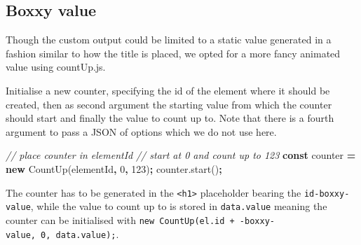 \documentclass[
]{krantz}
\makeatletter
\newenvironment{Shaded}{\begin{snugshade}}{\end{snugshade}}
\newcommand{\AttributeTok}[1]{\textcolor[rgb]{0.61,0.61,0.61}{#1}}
\newcommand{\CommentTok}[1]{\textcolor[rgb]{0.37,0.37,0.37}{\textit{#1}}}
\newcommand{\DecValTok}[1]{\textcolor[rgb]{0.06,0.06,0.06}{#1}}
\newcommand{\KeywordTok}[1]{\textcolor[rgb]{0.27,0.27,0.27}{\textbf{#1}}}
\newcommand{\NormalTok}[1]{#1}
\newcommand{\OperatorTok}[1]{\textcolor[rgb]{0.43,0.43,0.43}{\textbf{#1}}}
\newcommand{\StringTok}[1]{\textcolor[rgb]{0.5,0.5,0.5}{#1}}
\newcommand{\VariableTok}[1]{\textcolor[rgb]{0,0,0}{#1}}
\newenvironment{kframe}{%
\medskip{}
\setlength{\fboxsep}{.8em}
 \def\at@end@of@kframe{}%
 \ifinner\ifhmode%
  \def\at@end@of@kframe{\end{minipage}}%
  \begin{minipage}{\columnwidth}%
 \fi\fi%
 \def\FrameCommand##1{\hskip\@totalleftmargin \hskip-\fboxsep
 \colorbox{shadecolor}{##1}\hskip-\fboxsep
     \hskip-\linewidth \hskip-\@totalleftmargin \hskip\columnwidth}%
 \MakeFramed {\advance\hsize-\width
   \@totalleftmargin\z@ \linewidth\hsize
   \@setminipage}}%
 {\par\unskip\endMakeFramed%
 \at@end@of@kframe}
\renewenvironment{Shaded}{\begin{kframe}}{\end{kframe}}
\makeatother
\begin{document}
\hypertarget{boxxy-value}{%
\subsection{Boxxy value}\label{boxxy-value}}

Though the custom output could be limited to a static value generated in a fashion similar to how the title is placed, we opted for a more fancy animated value using countUp.js.

Initialise a new counter, specifying the id of the element where it should be created, then as second argument the starting value from which the counter should start and finally the value to count up to. Note that there is a fourth argument to pass a JSON of options which we do not use here.

\begin{Shaded}
\begin{Highlighting}[]
\CommentTok{// place counter in elementId}
\CommentTok{// start at 0 and count up to 123}
\KeywordTok{const}\NormalTok{ counter }\OperatorTok{=} \KeywordTok{new} \AttributeTok{CountUp}\NormalTok{(}\StringTok{\textquotesingle{}elementId\textquotesingle{}}\OperatorTok{,} \DecValTok{0}\OperatorTok{,} \DecValTok{123}\NormalTok{)}\OperatorTok{;}
\VariableTok{counter}\NormalTok{.}\AttributeTok{start}\NormalTok{()}\OperatorTok{;}
\end{Highlighting}
\end{Shaded}

The counter has to be generated in the \texttt{\textless{}h1\textgreater{}} placeholder bearing the \texttt{id-boxxy-value}, while the value to count up to is stored in \texttt{data.value} meaning the counter can be initialised with \texttt{new\ CountUp(el.id\ +\ \textquotesingle{}-boxxy-value\textquotesingle{},\ 0,\ data.value);}.
\end{document}
